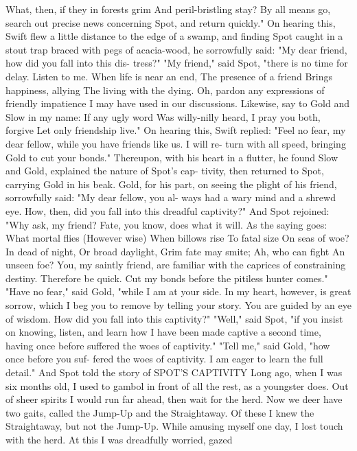 \documentclass{book}
\begin{document}
What, then, if they in forests grim
And peril-bristling stay?
By all means go, search out precise news concerning
Spot, and return quickly."
On hearing this, Swift flew a little distance to the
edge of a swamp, and finding Spot caught in a stout
trap braced with pegs of acacia-wood, he sorrowfully
said: "My dear friend, how did you fall into this dis-
tress?" "My friend," said Spot, "there is no time for
delay. Listen to me.
When life is near an end,
The presence of a friend
Brings happiness, allying
The living with the dying.
Oh, pardon any expressions of friendly impatience I
may have used in our discussions. Likewise, say to
Gold and Slow in my name:
If any ugly word
Was willy-nilly heard,
I pray you both, forgive
Let only friendship live."
On hearing this, Swift replied: "Feel no fear, my
dear fellow, while you have friends like us. I will re-
turn with all speed, bringing Gold to cut your bonds."
Thereupon, with his heart in a flutter, he found
Slow and Gold, explained the nature of Spot's cap-
tivity, then returned to Spot, carrying Gold in his
beak. Gold, for his part, on seeing the plight of his
friend, sorrowfully said: "My dear fellow, you al-
ways had a wary mind and a shrewd eye. How, then,
did you fall into this dreadful captivity?"
And Spot rejoined: "Why ask, my friend? Fate,
you know, does what it will. As the saying goes:
What mortal flies
(However wise)
When billows rise
To fatal size
On seas of woe?
In dead of night,
Or broad daylight,
Grim fate may smite;
Ah, who can fight
An unseen foe?
You, my saintly friend, are familiar with the caprices
of constraining destiny. Therefore be quick. Cut my
bonds before the pitiless hunter comes."
"Have no fear," said Gold, "while I am at your
side. In my heart, however, is great sorrow, which I
beg you to remove by telling your story. You are
guided by an eye of wisdom. How did you fall into
this captivity?"
"Well," said Spot, "if you insist on knowing,
listen, and learn how I have been made captive a
second time, having once before suffered the woes of
captivity."
"Tell me," said Gold, "how once before you suf-
fered the woes of captivity. I am eager to learn the
full detail." And Spot told the story of
SPOT'S CAPTIVITY
Long ago, when I was six months old, I used to
gambol in front of all the rest, as a youngster does.
Out of sheer spirits I would run far ahead, then wait
for the herd. Now we deer have two gaits, called the
Jump-Up and the Straightaway. Of these I knew the
Straightaway, but not the Jump-Up.
While amusing myself one day, I lost touch with
the herd. At this I was dreadfully worried, gazed
\end{document}
